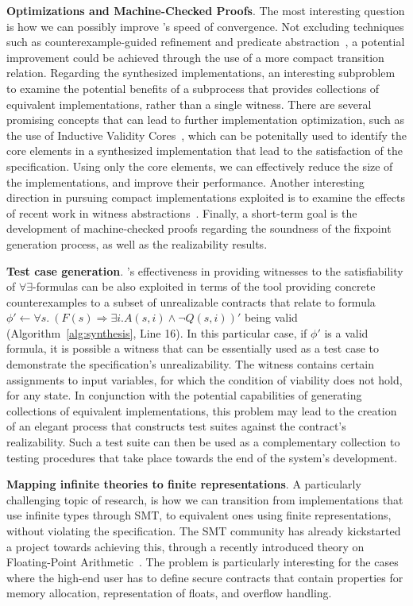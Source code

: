 \textbf{Optimizations and Machine-Checked Proofs}. The most interesting question is how we can possibly improve \jsynvg's
speed of convergence. Not excluding techniques such as counterexample-guided
refinement and predicate abstraction~\cite{walker2014predicate}, a potential
improvement could be achieved through the use of a more compact transition
relation. Regarding the synthesized implementations, an interesting subproblem to examine the potential benefits of a subprocess that provides collections of equivalent implementations, rather than
a single witness. There are several promising concepts that can lead to further implementation optimization, such as the use of Inductive Validity Cores~\cite{Ghass16}, which can be potenitally used to identify the core elements in a synthesized implementation that lead to the satisfaction of the specification. Using only the core elements, we can effectively reduce the size of the implementations, and improve their performance. Another interesting direction in pursuing compact implementations exploited is to examine the effects of recent work in witness abstractions~\cite{jakobs2017compact}. Finally, a short-term goal is the development of machine-checked
proofs regarding the soundness of the fixpoint generation process, as well as the realizability results.

\textbf{Test case generation}. \aeval's effectiveness in providing witnesses to the
satisfiability of $\forall\exists$-formulas can be also exploited in terms of the
tool providing concrete counterexamples to a subset of unrealizable contracts that relate to formula $\phi' \gets \forall s. \ (F(s) \Rightarrow \exists i. A(s,i) \land \lnot Q(s,i))'$ being valid (Algorithm~\ref{alg:synthesis}, Line 16). 
In this particular case, if $\phi'$ is a valid formula, it is possible a witness that can be essentially used as a test case to demonstrate the specification's unrealizability. The witness contains
certain assignments to input variables, for which the condition of viability does not hold, for any state. In conjunction with the potential capabilities of generating collections of equivalent implementations, this problem may lead to the creation of an elegant process that constructs test suites against the contract's realizability. Such a test suite can then be used as a complementary collection to testing procedures that take place towards the end of the system's development.    

\textbf{Mapping infinite theories to finite representations}. A particularly challenging topic of research, is how we can transition from implementations that use
infinite types through SMT, to equivalent ones using finite representations, without violating the specification. The SMT community has already kickstarted a project towards achieving this, through a recently introduced theory on Floating-Point Arithmetic~\cite{brain2015automatable}. The problem is particularly interesting for the cases where the high-end user has to define secure contracts that contain properties for memory allocation, representation of floats, and overflow handling.


